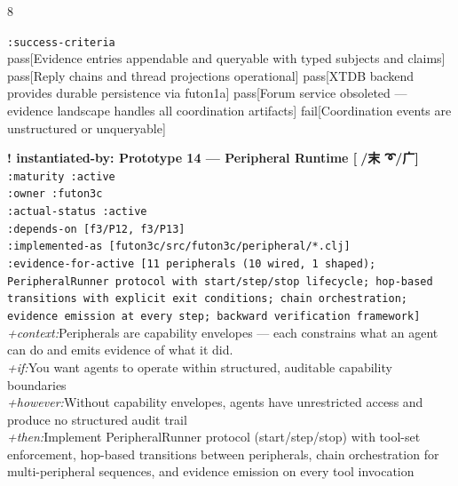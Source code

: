 \documentclass[landscape]{article}
\newcommand{\flexitag}[1]{\textcolor[gray]{0.35}{\textit{#1}}}
\newenvironment{devmapactive}{%
  \def\FrameCommand{\colorbox{devmapactivebg}}%
  \setlength{\fboxsep}{2pt}%
  \MakeFramed{\advance\hsize-\width \FrameRestore}%
}{\endMakeFramed}
\begin{document}
\begin{paracol}{8}
\begin{devmapactive}
\par
  \texttt{:\allowbreak{}success-\allowbreak{}criteria}\\
    pass[Evidence entries appendable and queryable with typed subjects and claims] pass[Reply chains and thread projections operational] pass[XTDB backend provides durable persistence via futon1a] pass[Forum service obsoleted — evidence landscape handles all coordination artifacts] fail[Coordination events are unstructured or unqueryable]\\
\par
\par
\end{devmapactive}
\begin{devmapactive}
\textbf{! instantiated-by: Prototype 14 — Peripheral Runtime [🌽/末 ➰/广]}\\
  \texttt{:\allowbreak{}maturity :\allowbreak{}active}\\
  \texttt{:\allowbreak{}owner :\allowbreak{}futon3c}\\
  \texttt{:\allowbreak{}actual-\allowbreak{}status :\allowbreak{}active}\\
  \texttt{:\allowbreak{}depends-\allowbreak{}on [f3/\allowbreak{}P12,\allowbreak{} f3/\allowbreak{}P13]}\\
  \texttt{:\allowbreak{}implemented-\allowbreak{}as [futon3c/\allowbreak{}src/\allowbreak{}futon3c/\allowbreak{}peripheral/\allowbreak{}*.clj]}\\
  \texttt{:\allowbreak{}evidence-\allowbreak{}for-\allowbreak{}active [11 peripherals (10 wired,\allowbreak{} 1 shaped);\allowbreak{} PeripheralRunner protocol with start/\allowbreak{}step/\allowbreak{}stop lifecycle;\allowbreak{} hop-\allowbreak{}based transitions with explicit exit conditions;\allowbreak{} chain orchestration;\allowbreak{} evidence emission at every step;\allowbreak{} backward verification framework]}\\
  \flexitag{+context:}Peripherals are capability envelopes — each constrains what an agent can do and emits evidence of what it did.\\
  \flexitag{+if:}You want agents to operate within structured, auditable capability boundaries\\
  \flexitag{+however:}Without capability envelopes, agents have unrestricted access and produce no structured audit trail\\
  \flexitag{+then:}Implement PeripheralRunner protocol (start/step/stop) with tool-set enforcement, hop-based transitions between peripherals, chain orchestration for multi-peripheral sequences, and evidence emission on every tool invocation\\

\end{devmapactive}
\end{paracol}
\end{document}
